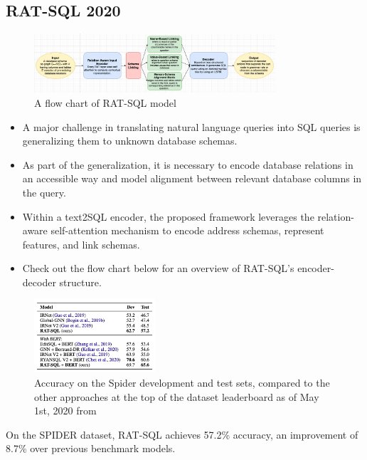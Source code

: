 \subsection{RAT-SQL 2020}

\begin{figure}[htb]
    \centering
    \includegraphics[width=0.8\textwidth]{pics/RAT-SQL/flow.png}
    \caption{A flow chart of RAT-SQL model}
    \label{fig:RAT-SQL-flow}
\end{figure}

\begin{itemize}
    \item A major challenge in translating natural language queries into SQL queries is generalizing them to unknown database schemas.
    \item As part of the generalization, it is necessary to encode database relations in an accessible way and model alignment between relevant database columns in the query.
    \item Within a text2SQL encoder, the proposed framework leverages the relation-aware self-attention mechanism to encode address schemas, represent features, and link schemas.
    \item Check out the flow chart below for an overview of RAT-SQL's encoder-decoder structure.
\end{itemize}

\begin{figure}[htb]
    \centering
    \includegraphics[width=0.4\textwidth]{pics/RAT-SQL/Accuracy.png}
    \caption{Accuracy on the Spider development and test sets, compared to the other approaches at the top of the dataset leaderboard as of May 1st, 2020 from \cite{wang_rat-sql_2021}}
    \label{fig:RAT-SQL-Accuracy}
\end{figure}

On the SPIDER dataset, RAT-SQL achieves 57.2\% accuracy, an improvement of 8.7\% over previous benchmark models.

